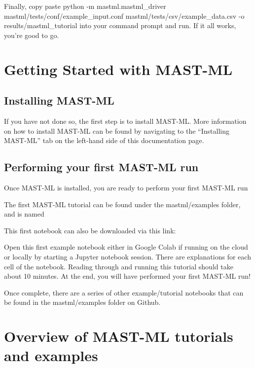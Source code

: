 \documentclass[letterpaper,10pt,english]{sphinxmanual}
\begin{document}
Finally, copy paste python -m mastml.mastml\_driver mastml/tests/conf/example\_input.conf mastml/tests/csv/example\_data.csv -o results/mastml\_tutorial into your command prompt and run. If it all works, you’re good to go.


\chapter{Getting Started with MAST-ML}
\label{\detokenize{0_3_startup:getting-started-with-mast-ml}}\label{\detokenize{0_3_startup::doc}}

\section{Installing MAST-ML}
\label{\detokenize{0_3_startup:installing-mast-ml}}
If you have not done so, the first step is to install MAST-ML. More information on how to install MAST-ML can be found
by navigating to the “Installing MAST-ML” tab on the left-hand side of this documentation page.


\section{Performing your first MAST-ML run}
\label{\detokenize{0_3_startup:performing-your-first-mast-ml-run}}
Once MAST-ML is installed, you are ready to perform your first MAST-ML run

The first MAST-ML tutorial can be found under the mastml/examples folder, and is named 

This first notebook can also be downloaded via this link: 

Open this first example notebook either in Google Colab if running on the cloud or locally by starting a Jupyter notebook
session. There are explanations for each cell of the notebook. Reading through and running this tutorial should take
about 10 minutes. At the end, you will have performed your first MAST-ML run!

Once complete, there are a series of other example/tutorial notebooks that can be found in the mastml/examples folder
on Github.


\chapter{Overview of MAST-ML tutorials and examples}
\label{\detokenize{0_5_tutorials:overview-of-mast-ml-tutorials-and-examples}}\label{\detokenize{0_5_tutorials::doc}}
\end{document}
